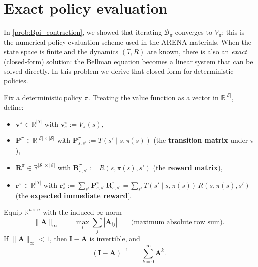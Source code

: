\documentclass[11pt]{article}
\newcommand{\cS}{\mathcal{S}}
\begin{document}

\section{Exact policy evaluation}\label{prob:exact_eval}

In \cref{prob:Bpi_contraction}, we showed that iterating $\mathcal{B}_\pi$ converges to $V_\pi$; this is the numerical policy evaluation scheme used in the ARENA materials. When the state space is finite and the dynamics $(T, R)$ are known, there is also an \emph{exact} (closed-form) solution: the Bellman equation becomes a linear system that can be solved directly. In this problem we derive that closed form for deterministic policies.

\begin{definition}\label{def:matrix_notation}
Fix a deterministic policy $\pi$. Treating the value function as a vector in $\mathbb{R}^{|\cS|}$, define:
\begin{itemize}\itemsep=2pt
  \item $\mathbf{v}^\pi \in \mathbb{R}^{|\cS|}$ with $\mathbf{v}^\pi_s := V_\pi(s)$,
  \item $\mathbf{P}^\pi \in \mathbb{R}^{|\cS| \times |\cS|}$ with $\mathbf{P}^\pi_{s,s'} := T(s' \mid s, \pi(s))$ (the \textbf{transition matrix} under $\pi$),
  \item $\mathbf{R}^\pi \in \mathbb{R}^{|\cS| \times |\cS|}$ with $\mathbf{R}^\pi_{s,s'} := R(s, \pi(s), s')$ (the \textbf{reward matrix}),
  \item $\mathbf{r}^\pi \in \mathbb{R}^{|\cS|}$ with $\mathbf{r}^\pi_s := \sum_{s'} \mathbf{P}^\pi_{s,s'}\, \mathbf{R}^\pi_{s,s'} = \sum_{s'} T(s' \mid s, \pi(s))\, R(s, \pi(s), s')$ (the \textbf{expected immediate reward}).
\end{itemize}
\end{definition}

\begin{fact}\label{fact:neumann}
Equip $\mathbb{R}^{n \times n}$ with the induced $\infty$-norm
$$\|\mathbf{A}\|_\infty \;:=\; \max_i \sum_j |\mathbf{A}_{ij}| \qquad \text{(maximum absolute row sum).}$$
If $\|\mathbf{A}\|_\infty < 1$, then $\mathbf{I} - \mathbf{A}$ is invertible, and
$$(\mathbf{I} - \mathbf{A})^{-1} \;=\; \sum_{k=0}^{\infty} \mathbf{A}^k.$$
\end{fact}
\end{document}
